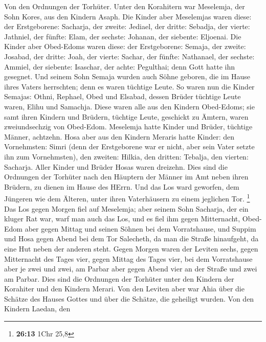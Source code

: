 Von den Ordnungen der Torhüter. Unter den Korahitern war
Meselemja, der Sohn Kores, aus den Kindern Asaph.  Die
Kinder aber Meselemjas waren diese: der Erstgeborene: Sacharja, der
zweite: Jediael, der dritte: Sebadja, der vierte: Jathniel,
 der fünfte: Elam, der sechste: Johanan, der siebente:
Eljoenai.  Die Kinder aber Obed-Edoms waren diese: der
Erstgeborene: Semaja, der zweite: Josabad, der dritte: Joah, der vierte:
Sachar, der fünfte: Nathanael,  der sechste: Ammiel, der
siebente: Isaschar, der achte: Pegulthai; denn Gott hatte ihn gesegnet.
 Und seinem Sohn Semaja wurden auch Söhne geboren, die im
Hause ihres Vaters herrschten; denn es waren tüchtige Leute.
 So waren nun die Kinder Semajas: Othni, Rephael, Obed und
Elsabad, dessen Brüder tüchtige Leute waren, Elihu und Samachja.
 Diese waren alle aus den Kindern Obed-Edoms; sie samt
ihren Kindern und Brüdern, tüchtige Leute, geschickt zu Ämtern, waren
zweiundsechzig von Obed-Edom.  Meselemja hatte Kinder und
Brüder, tüchtige Männer, achtzehn.  Hosa aber aus den
Kindern Meraris hatte Kinder: den Vornehmsten: Simri (denn der
Erstgeborene war er nicht, aber sein Vater setzte ihn zum Vornehmsten),
 den zweiten: Hilkia, den dritten: Tebalja, den vierten:
Sacharja. Aller Kinder und Brüder Hosas waren dreizehn. 
Dies sind die Ordnungen der Torhüter nach den Häuptern der Männer im Amt
neben ihren Brüdern, zu dienen im Hause des HErrn.  Und
das Los ward geworfen, dem Jüngeren wie dem Älteren, unter ihren
Vaterhäusern zu einem jeglichen Tor. \footnote{\textbf{26:13} 1Chr 25,8}
 Das Los gegen Morgen fiel auf Meselemja; aber seinem
Sohn Sacharja, der ein kluger Rat war, warf man auch das Los, und es
fiel ihm gegen Mitternacht,  Obed-Edom aber gegen Mittag
und seinen Söhnen bei dem Vorratshause,  und Suppim und
Hosa gegen Abend bei dem Tor Salecheth, da man die Straße hinaufgeht, da
eine Hut neben der anderen steht.  Gegen Morgen waren der
Leviten sechs, gegen Mitternacht des Tages vier, gegen Mittag des Tages
vier, bei dem Vorratshause aber je zwei und zwei,  am
Parbar aber gegen Abend vier an der Straße und zwei am Parbar.
 Dies sind die Ordnungen der Torhüter unter den Kindern
der Korahiter und den Kindern Merari.  Von den Leviten
aber war Ahia über die Schätze des Hauses Gottes und über die Schätze,
die geheiligt wurden.  Von den Kindern Laedan, den
